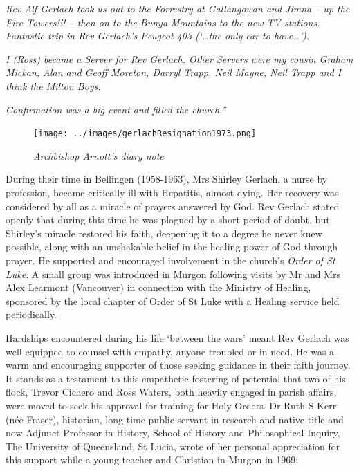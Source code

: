 \smallskip


\emph{Rev Alf Gerlach took us out to the Forrestry at Gallangowan and Jimna -- up the Fire Towers!!! -- then on to the Bunya Mountains to the new TV stations. Fantastic trip in Rev Gerlach's Peugeot 403 (`\ldots the only car to have\ldots').}



\smallskip


\emph{I (Ross) became a Server for Rev Gerlach. Other Servers were my cousin Graham Mickan, Alan and Geoff Moreton, Darryl Trapp, Neil Mayne, Neil Trapp and I think the Milton Boys.}



\smallskip


\emph{Confirmation was a big event and filled the church.''}



\medskip








\begin{figure}[!htb]
\begin{center}
\texttt{[image: ../images/gerlachResignation1973.png]}
\caption{\itshape Archbishop Arnott's diary note}
\end{center}
\end{figure}




During their time in Bellingen (1958-1963), Mrs Shirley Gerlach, a nurse by profession, became critically ill with Hepatitis, almost dying. Her recovery was considered by all as a miracle of prayers answered by God. Rev Gerlach stated openly that during this time he was plagued by a short period of doubt, but Shirley's miracle restored his faith, deepening it to a degree he never knew possible, along with an unshakable belief in the healing power of God through prayer. He supported and encouraged involvement in the church's \emph{Order of St Luke}. A small group was introduced in Murgon following visits by Mr and Mrs Alex Learmont (Vancouver) in connection with the Ministry of Healing, sponsored by the local chapter of Order of St Luke with a Healing service held periodically.



Hardships encountered during his life `between the wars' meant Rev Gerlach was well equipped to counsel with empathy, anyone troubled or in need. He was a warm and encouraging supporter of those seeking guidance in their faith journey. It stands as a testament to this empathetic fostering of potential that two of his flock, Trevor Cichero and Ross Waters, both heavily engaged in parish affairs, were moved to seek his approval for training for Holy Orders. Dr Ruth S Kerr (née Fraser), historian, long-time public servant in research and native title and now Adjunct Professor in History, School of History and Philosophical Inquiry, The University of Queensland, St Lucia, wrote of her personal appreciation for this support while a young teacher and Christian in Murgon in 1969:



